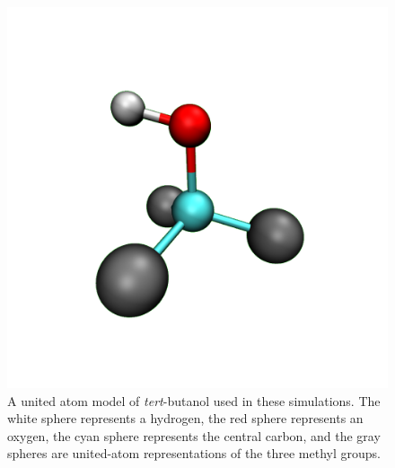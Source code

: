 \begin{figure}
    \center
    \includegraphics[width=\single]{figures-helix/tba.png}
    \caption[United atom representation of \emph{tert}-butanol]{
        A united atom model of \emph{tert}-butanol used in these simulations. 
        The white sphere represents a hydrogen, the red sphere represents an oxygen, the cyan sphere represents the central carbon, and the gray spheres are united-atom representations of the three methyl groups.
    }
    \label{fig:helix-tba}
\end{figure}

